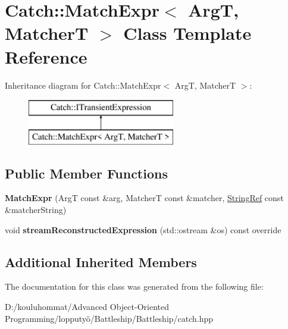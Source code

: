 \hypertarget{class_catch_1_1_match_expr}{}\section{Catch\+:\+:Match\+Expr$<$ ArgT, MatcherT $>$ Class Template Reference}
\label{class_catch_1_1_match_expr}
Inheritance diagram for Catch\+:\+:Match\+Expr$<$ ArgT, MatcherT $>$\+:\begin{figure}[H]
\begin{center}
\leavevmode
\includegraphics[height=2.000000cm]{class_catch_1_1_match_expr}
\end{center}
\end{figure}
\subsection*{Public Member Functions}
\begin{DoxyCompactItemize}
\item 
\mbox{\label{class_catch_1_1_match_expr_ae55ee9bf46c8676c65e9df291a98c345}} 
{\bfseries Match\+Expr} (ArgT const \&arg, MatcherT const \&matcher, \mbox{\hyperlink{class_catch_1_1_string_ref}{String\+Ref}} const \&matcher\+String)
\item 
\mbox{\label{class_catch_1_1_match_expr_ad3e41adb597750b2219bb37e51185629}} 
void {\bfseries stream\+Reconstructed\+Expression} (std\+::ostream \&os) const override
\end{DoxyCompactItemize}
\subsection*{Additional Inherited Members}


The documentation for this class was generated from the following file\+:\begin{DoxyCompactItemize}
\item 
D\+:/kouluhommat/\+Advanced Object-\/\+Oriented Programming/lopputyö/\+Battleship/\+Battleship/catch.\+hpp\end{DoxyCompactItemize}
